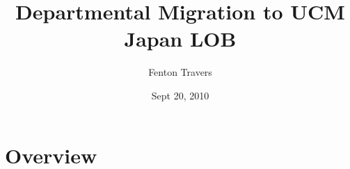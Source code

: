 \documentclass[final,letterpaper,12pt]{article}
\title{
  Departmental Migration to UCM\\
  Japan LOB}
\date{Sept 20, 2010}
\author{Fenton Travers}
\begin{document}
\setlength\fboxsep{1pt}
\setlength\fboxrule{0.5pt}
\maketitle
\newpage
\tableofcontents
\newpage
\listoffigures   
\newpage
\section{Overview} 
  
\clearpage
\end{document}
